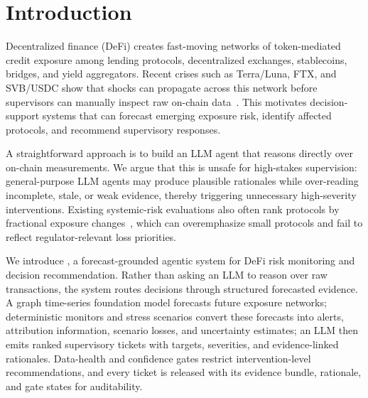 \section{Introduction}
\label{sec:intro}

Decentralized finance (DeFi) creates fast-moving networks of token-mediated credit exposure among lending protocols, decentralized exchanges, stablecoins, bridges, and yield aggregators. Recent crises such as Terra/Luna, FTX, and SVB/USDC show that shocks can propagate across this network before supervisors can manually inspect raw on-chain data~\citep{VidalTomasEtAl2023FTX}. This motivates decision-support systems that can forecast emerging exposure risk, identify affected protocols, and recommend supervisory responses.

A straightforward approach is to build an LLM agent that reasons directly over on-chain measurements. We argue that this is unsafe for high-stakes supervision: general-purpose LLM agents may produce plausible rationales while over-reading incomplete, stale, or weak evidence, thereby triggering unnecessary high-severity interventions. Existing systemic-risk evaluations also often rank protocols by fractional exposure changes~\citep{BERTOMEU2024105321,gonon2025computingsystemicriskmeasures,li2025hgmae}, which can overemphasize small protocols and fail to reflect regulator-relevant loss priorities.

We introduce \emph{\sysname{}}, a forecast-grounded agentic system for DeFi risk monitoring and decision recommendation. Rather than asking an LLM to reason over raw transactions, the system routes decisions through structured forecasted evidence. A graph time-series foundation model forecasts future exposure networks; deterministic monitors and stress scenarios convert these forecasts into alerts, attribution information, scenario losses, and uncertainty estimates; an LLM then emits ranked supervisory tickets with targets, severities, and evidence-linked rationales. Data-health and confidence gates restrict intervention-level recommendations, and every ticket is released with its evidence bundle, rationale, and gate states for auditability.

